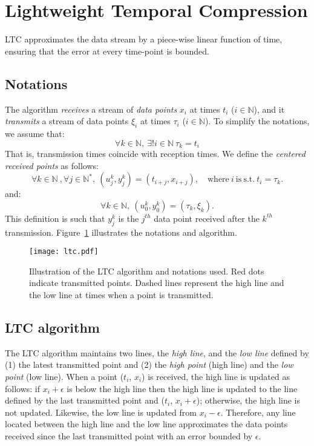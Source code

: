 \documentclass[10pt, conference, compsocconf]{IEEEtran}
\begin{document}
\section{Lightweight Temporal Compression}
\label{sec:ltc}

LTC approximates the data stream
by a piece-wise linear function of time, ensuring that the error at
every time-point is bounded.

\subsection{Notations}

The algorithm \emph{receives} a stream of \emph{data points} $x_i$
at times $t_i$ ($i \in \mathbb{N}$), and it \emph{transmits} a stream of data points $\xi_i$
at times $\tau_i$ ($i \in \mathbb{N}$). To simplify the notations, we assume that:
\begin{equation*}
\forall k \in \mathbb{N}, \  \exists ! i \in \mathbb{N} \  \tau_k = t_i
\end{equation*}
That is, transmission times coincide with reception times.
We define the \emph{centered received points} as follows:
\begin{equation*}
\forall k \in \mathbb{N}\ , \forall j \in \mathbb{N^*},\ (u^k_j, y^k_j) = (t_{i+j}, x_{i+j}), \quad \mathrm{where\ }i\mathrm{\ is\ s.t.}\ t_i = \tau_k.
\end{equation*}
and:
\begin{equation*}
\forall k \in \mathbb{N},\  (u^k_0, y^k_0) = (\tau_k, \xi_k).
\end{equation*}
This definition is such that $y^k_j$ is the $j^{th}$ data point received
after the $k^{th}$ transmission.
Figure~\ref{fig:ltc} illustrates the notations and algorithm.
\begin{figure}
\texttt{[image: ltc.pdf]}
\caption{Illustration of the LTC algorithm and notations used. Red dots indicate transmitted points. Dashed lines
represent the high line and the low line at times when a point is transmitted.}
\label{fig:ltc}
\end{figure}
\subsection{LTC algorithm}

The LTC algorithm maintains two lines, the \emph{high line}, and the
\emph{low line} defined by (1) the latest transmitted point and (2) the
\emph{high point} (high line) and the \emph{low point} (low line). When
a point ($t_i$, $x_i$) is received, the high line is updated as
follows: if $x_i+\epsilon$ is below the high line then the high line is
updated to the line defined by the last transmitted point and ($t_i$,
$x_i+\epsilon$); otherwise, the high line is not updated. Likewise, the low line
is updated from $x_i-\epsilon$. Therefore, any line located between the
high line and the low line approximates the data points received since
the last transmitted point with an error bounded by $\epsilon$.
\end{document}
